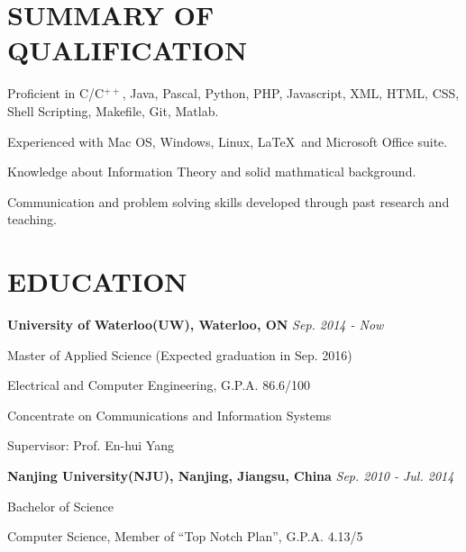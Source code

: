 \documentclass{res}
\newcommand{\parsp}{\vspace{-0.5\baselineskip}}
\newcommand{\additemindent}{\addtolength{\itemindent}{1em}}
\begin{document}
\begin{resume}


\parsp
\section{SUMMARY OF QUALIFICATION}
	\begin{asparaitem}
		\item 	Proficient in C/C$^{++}$, Java, Pascal, Python, PHP, Javascript, XML, HTML, CSS, Shell Scripting, Makefile, Git, Matlab.
		\item 	Experienced with Mac OS, Windows, Linux, \LaTeX\  and Microsoft Office suite.
		\item 	Knowledge about Information Theory and solid mathmatical background.
		\item 	Communication and problem solving skills developed through past research and teaching.
	\end{asparaitem}


\parsp
\section{EDUCATION}
	\textbf{University of Waterloo(UW), Waterloo, ON} \hfill \emph{Sep. 2014 - Now}
	\begin{asparaitem}[$\circ$]
		\additemindent
		\item Master of Applied Science (Expected graduation in Sep. 2016) 
		\item Electrical and Computer Engineering, G.P.A. 86.6/100
		\item Concentrate on Communications and Information Systems
		\item Supervisor: Prof. En-hui Yang
  	\end{asparaitem}

  	\vspace{-0.7\baselineskip}

	\textbf{Nanjing University(NJU), Nanjing, Jiangsu, China} \hfill \emph{Sep. 2010 - Jul. 2014}
	\begin{asparaitem}[$\circ$]
		\additemindent
		\item Bachelor of Science
		\item Computer Science, Member of ``Top Notch Plan'', G.P.A. 4.13/5
	\end{asparaitem}



\end{resume}
\end{document}
